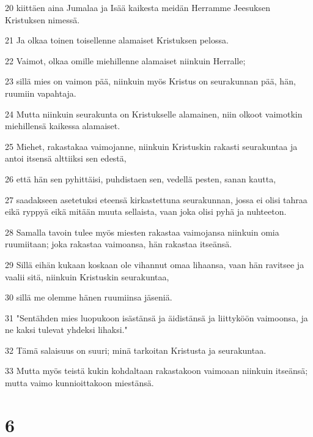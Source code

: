 \par 20 kiittäen aina Jumalaa ja Isää kaikesta meidän Herramme Jeesuksen Kristuksen nimessä.
\par 21 Ja olkaa toinen toisellenne alamaiset Kristuksen pelossa.
\par 22 Vaimot, olkaa omille miehillenne alamaiset niinkuin Herralle;
\par 23 sillä mies on vaimon pää, niinkuin myös Kristus on seurakunnan pää, hän, ruumiin vapahtaja.
\par 24 Mutta niinkuin seurakunta on Kristukselle alamainen, niin olkoot vaimotkin miehillensä kaikessa alamaiset.
\par 25 Miehet, rakastakaa vaimojanne, niinkuin Kristuskin rakasti seurakuntaa ja antoi itsensä alttiiksi sen edestä,
\par 26 että hän sen pyhittäisi, puhdistaen sen, vedellä pesten, sanan kautta,
\par 27 saadakseen asetetuksi eteensä kirkastettuna seurakunnan, jossa ei olisi tahraa eikä ryppyä eikä mitään muuta sellaista, vaan joka olisi pyhä ja nuhteeton.
\par 28 Samalla tavoin tulee myös miesten rakastaa vaimojansa niinkuin omia ruumiitaan; joka rakastaa vaimoansa, hän rakastaa itseänsä.
\par 29 Sillä eihän kukaan koskaan ole vihannut omaa lihaansa, vaan hän ravitsee ja vaalii sitä, niinkuin Kristuskin seurakuntaa,
\par 30 sillä me olemme hänen ruumiinsa jäseniä.
\par 31 "Sentähden mies luopukoon isästänsä ja äidistänsä ja liittyköön vaimoonsa, ja ne kaksi tulevat yhdeksi lihaksi."
\par 32 Tämä salaisuus on suuri; minä tarkoitan Kristusta ja seurakuntaa.
\par 33 Mutta myös teistä kukin kohdaltaan rakastakoon vaimoaan niinkuin itseänsä; mutta vaimo kunnioittakoon miestänsä.

\chapter{6}

